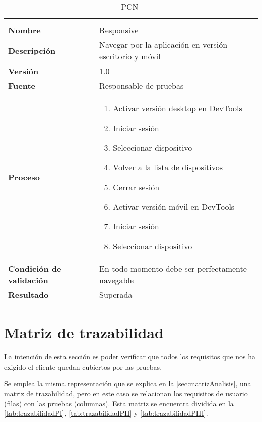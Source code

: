 \begin{table}[H]
	\caption{PCN-\number\pcn}
	\begin{tabular}{|l|p{}|}
		\hline
		\multicolumn{2}{|c|}{\cellcolor[HTML]{BFBFBF}{\color[HTML]{000000} \textbf{PCN-\number\pcn}}} \\ \hline
		\textbf{Nombre}                  & Responsive                                              \\ \hline
		\textbf{Descripción}             & Navegar por la aplicación en versión escritorio y móvil \\ \hline
		\textbf{Versión}                 & 1.0                                                     \\ \hline
		\textbf{Fuente}                  & Responsable de pruebas                                  \\ \hline
		\textbf{Proceso}                 & \begin{enumerate}
			\item Activar versión desktop en DevTools
			\item Iniciar sesión
			\item Seleccionar dispositivo
			\item Volver a la lista de dispositivos
			\item Cerrar sesión
			\item Activar versión móvil en DevTools
			\item Iniciar sesión
			\item Seleccionar dispositivo
		\end{enumerate}                              \\ \hline
		\textbf{Condición de validación} & En todo momento debe ser perfectamente navegable        \\ \hline
		\textbf{Resultado}               & Superada                                                \\ \hline
	\end{tabular}
\end{table}
\pagebreak

\section{Matriz de trazabilidad}\label{sec:matriz-de-trazabilidad}
La intención de esta sección es poder verificar que todos los requisitos que nos ha exigido el cliente quedan cubiertos por las pruebas.

Se emplea la misma representación que se explica en la \autoref{sec:matrizAnalisis}, una matriz de trazabilidad, pero en este caso se relacionan los requisitos de usuario (filas) con las pruebas (columnas). Esta matriz se encuentra dividida en la \autoref{tab:trazabilidadPI}, \autoref{tab:trazabilidadPII} y \autoref{tab:trazabilidadPIII}.

